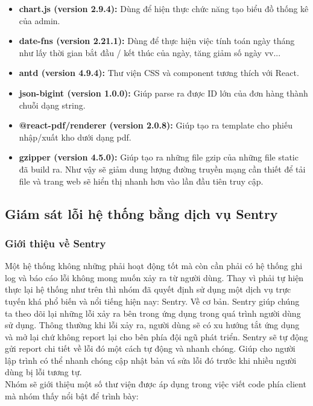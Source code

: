 			\begin{itemize}
				\item \textbf{chart.js (version 2.9.4):} Dùng để hiện thực chức năng tạo biểu đồ thống kê của admin.
				\item \textbf{date-fns (version 2.21.1):} Dùng để thực hiện việc tính toán ngày tháng như lấy thời gian bắt đầu / kết thúc của ngày, tăng giảm số ngày vv...
				\item \textbf{antd (version 4.9.4):} Thư viện CSS và component tương thích với React.
				\item \textbf{json-bigint (version 1.0.0):} Giúp parse ra được ID lớn của đơn hàng thành chuỗi dạng string.
				\item \textbf{@react-pdf/renderer (version 2.0.8):} Giúp tạo ra template cho phiếu nhập/xuất kho dưới dạng pdf.
				\item \textbf{gzipper (version 4.5.0):} Giúp tạo ra những file gzip của những file static đã build ra. Như vậy sẽ giảm dung lượng đường truyền mạng cần thiết để tải file và trang web sẽ hiển thị nhanh hơn vào lần đầu tiên truy cập.
			\end{itemize}
			
	
		\subsection{Giám sát lỗi hệ thống bằng dịch vụ Sentry}
			\subsubsection{Giới thiệu về Sentry}
				Một hệ thống không những phải hoạt động tốt mà còn cần phải có hệ thống ghi log và báo cáo lỗi không mong muốn xảy ra từ người dùng. Thay vì phải tự hiện thực lại hệ thống như trên thì nhóm đã quyết định sử dụng một dịch vụ trực tuyến khá phổ biến và nổi tiếng hiện nay: Sentry. Về cơ bản. Sentry giúp chúng ta theo dõi lại những lỗi xảy ra bên trong ứng dụng trong quá trình người dùng sử dụng. Thông thường khi lỗi xảy ra, người dùng sẽ có xu hướng tắt ứng dụng và mở lại chứ không report lại cho bên phía đội ngũ phát triển. Sentry sẽ tự động gửi report chi tiết về lỗi đó một cách tự động và nhanh chóng. Giúp cho người lập trình có thể nhanh chóng cập nhật bản vá sửa lỗi đó trước khi nhiều người dùng bị lỗi tương tự. \\
				
				Nhóm sẽ giới thiệu một số thư viện được áp dụng trong việc viết code phía client mà nhóm thấy nổi bật để trình bày:\\
				
